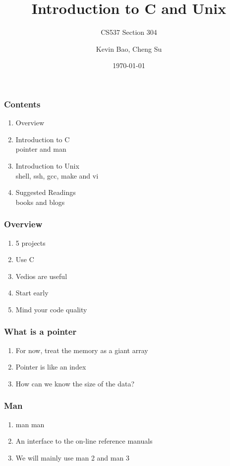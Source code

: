 \documentclass{beamer}
\title{Introduction to C and Unix}
\subtitle{CS537 Section 304}
\author{Kevin Bao, Cheng Su}
\date{\today}
\begin{document}
	\setcounter{framenumber}{0}
	\frame{\titlepage}
	\setcounter{showProgressBar}{1}
	\setcounter{showSlideNumbers}{1}

	\begin{frame}
		\frametitle{Contents}
		\begin{enumerate}
			\item Overview \\
			\item Introduction to C \\ 
				\textcolor{ExecusharesGrey}{\footnotesize\hspace{1em} pointer and man}
			\item Introduction to Unix  \\ 
				\textcolor{ExecusharesGrey}{\footnotesize\hspace{1em} shell, ssh, gcc, make and vi}
			\item Suggested Readings \\ 
				\textcolor{ExecusharesGrey}{\footnotesize\hspace{1em} books and blogs}
		\end{enumerate}
	\end{frame}

  \begin{frame}
    \frametitle{Overview}
		\begin{enumerate}
			\item 5 projects
			\item Use C
			\item Vedios are useful
			\item Start early
			\item Mind your code quality
		\end{enumerate}
	\end{frame}

  \begin{frame}
    \frametitle{What is a pointer}
    \begin{enumerate}
      \item For now, treat the memory as a giant array
      \item Pointer is like an index
      \item How can we know the size of the data?
    \end{enumerate}
  \end{frame}

  \begin{frame}
    \frametitle{Man}
    \begin{enumerate}
      \item man man
      \item An interface to the on-line reference manuals
      \item We will mainly use man 2 and man 3
    \end{enumerate}
  \end{frame}
\end{document}
